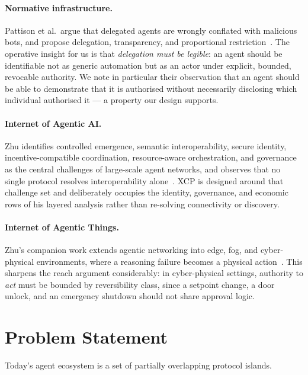 \documentclass[11pt]{article}
\begin{document}
\paragraph{Normative infrastructure.}
Pattison et al.\ argue that delegated agents are wrongly conflated with malicious
bots, and propose delegation, transparency, and proportional
restriction~\cite{pattison2026}. The operative insight for us is that
\emph{delegation must be legible}: an agent should be identifiable not as
generic automation but as an actor under explicit, bounded, revocable authority.
We note in particular their observation that an agent should be able to
demonstrate that it is authorised without necessarily disclosing which individual
authorised it --- a property our design supports.

\paragraph{Internet of Agentic AI.}
Zhu identifies controlled emergence, semantic interoperability, secure identity,
incentive-compatible coordination, resource-aware orchestration, and governance
as the central challenges of large-scale agent networks, and observes that no
single protocol resolves interoperability alone~\cite{zhu2026ioai}. XCP is
designed around that challenge set and deliberately occupies the identity,
governance, and economic rows of his layered analysis rather than re-solving
connectivity or discovery.

\paragraph{Internet of Agentic Things.}
Zhu's companion work extends agentic networking into edge, fog, and
cyber-physical environments, where a reasoning failure becomes a physical
action~\cite{zhu2026ioat}. This sharpens the reach argument considerably: in
cyber-physical settings, authority to \emph{act} must be bounded by reversibility
class, since a setpoint change, a door unlock, and an emergency shutdown should
not share approval logic.

\section{Problem Statement}

Today's agent ecosystem is a set of partially overlapping protocol islands.
\end{document}
